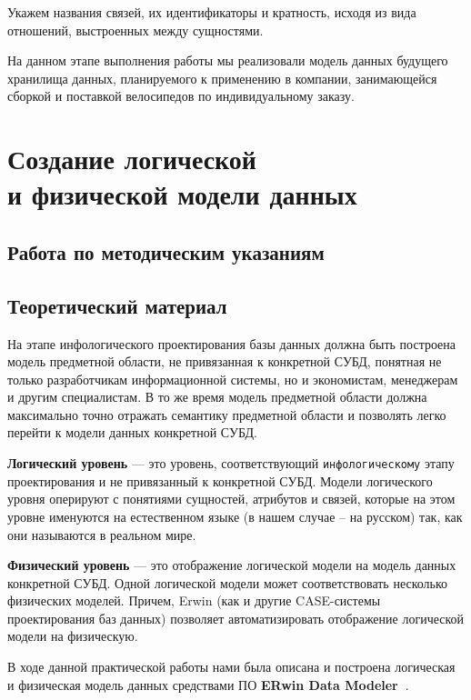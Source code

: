 \documentclass[a4paper,14pt]{extarticle}
\newcommand{\erdatamodaler}{\textbf{ERwin Data Modeler~}}
\newcommand{\methodsection}{Работа по методическим указаниям~}
\begin{document}
Укажем названия связей, их идентификаторы и кратность, исходя из вида отношений, выстроенных между сущностями.

На данном этапе выполнения работы мы реализовали модель данных будущего хранилища данных, планируемого к применению в компании, занимающейся сборкой и поставкой велосипедов по индивидуальному заказу.

\section{Создание логической\\и физической модели данных}
\subsection{\methodsection}
\subsection*{Теоретический материал}
На этапе {инфологического} проектирования базы данных должна быть построена
модель предметной области, не привязанная к конкретной СУБД, понятная не только
разработчикам информационной системы, но и экономистам, менеджерам и другим
специалистам. В то же время модель предметной области должна максимально точно
отражать семантику предметной области и позволять легко перейти к модели данных
конкретной СУБД.

\textbf{Логический уровень} --- это уровень, соответствующий \texttt{инфологическому} этапу проектирования
и не привязанный к конкретной СУБД. Модели логического уровня оперируют с
понятиями сущностей, атрибутов и связей, которые на этом уровне именуются на
естественном языке (в нашем случае – на русском) так, как они называются в
реальном мире.

\textbf{Физический уровень} --- это отображение логической модели на модель данных
конкретной СУБД. Одной логической модели может соответствовать несколько
физических моделей. Причем, Erwin (как и другие CASE-системы проектирования баз
данных) позволяет автоматизировать отображение логической модели на физическую.


В ходе данной практической работы нами была описана и построена логическая и физическая модель данных средствами ПО \erdatamodaler.
\end{document}
